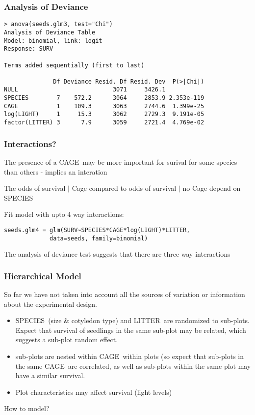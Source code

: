 \documentclass[]{beamer}
\def\C{\textsf{CAGE}}
\def\Li{\textsf{LITTER}}
\def\V{\textsf{SPECIES}}
\begin{document}
\begin{frame}[fragile]\frametitle{Analysis of Deviance}
\begin{verbatim}
> anova(seeds.glm3, test="Chi")
Analysis of Deviance Table
Model: binomial, link: logit
Response: SURV

Terms added sequentially (first to last)

              Df Deviance Resid. Df Resid. Dev  P(>|Chi|)
NULL                           3071     3426.1           
SPECIES        7    572.2      3064     2853.9 2.353e-119
CAGE           1    109.3      3063     2744.6  1.399e-25
log(LIGHT)     1     15.3      3062     2729.3  9.191e-05
factor(LITTER) 3      7.9      3059     2721.4  4.769e-02
\end{verbatim}
\end{frame}
\begin{frame}[fragile]\frametitle{Interactions?}
The presence of a \C\ may be more important for surival for some
species than others - implies an interation \pause

The odds of survival $|$ Cage  compared to odds of survival $|$ no Cage
depend on \V \pause

Fit model with upto 4 way interactions:
\begin{verbatim}
seeds.glm4 = glm(SURV~SPECIES*CAGE*log(LIGHT)*LITTER, 
             data=seeds, family=binomial)
\end{verbatim}
The analysis of deviance test suggests that there are three way interactions  
\end{frame}
\begin{frame}\frametitle{Hierarchical Model}

So far we have not taken into account all the sources of variation or
information about the experimental design.
\pause
\begin{itemize}
\item 
\V\ (size \& cotyledon type) and \Li\ are  randomized to sub-plots.
Expect that survival of seedlings in the same sub-plot may be related,
which suggests a sub-plot random effect.
\pause
\item sub-plots are nested within \C\ within plots (so expect that
  sub-plots in the same \C\ are correlated, as well as sub-plots within the same plot may have a similar survival. 
\pause
\item Plot  characteristics may affect survival (light levels)
\pause
\end{itemize}

How to model?  


  
\end{frame}
\end{document}

